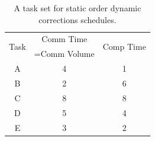 \documentclass[runningheads]{llncs} %
\begin{document}
	\begin{table}[htb]
	\begin{center}
		
		\begin{tabular}{|c|c|c|}
			\hline
			\multirow{2}{*}{Task} & Comm Time & \multirow{2}{*}{Comp Time}\\ 
			&=Comm Volume& \\ \hline
			A & 4 & 1\\ \hline
			B & 2 & 6\\ \hline
			C & 8 & 8\\ \hline
			D & 5 & 4\\ \hline
			E & 3 & 2\\ \hline
		\end{tabular}
		\caption{\label{tab:staticOrderDynamicCorrectionsExample} A task set for static order dynamic corrections schedules.}
	\end{center}
\end{table}
\end{document}
